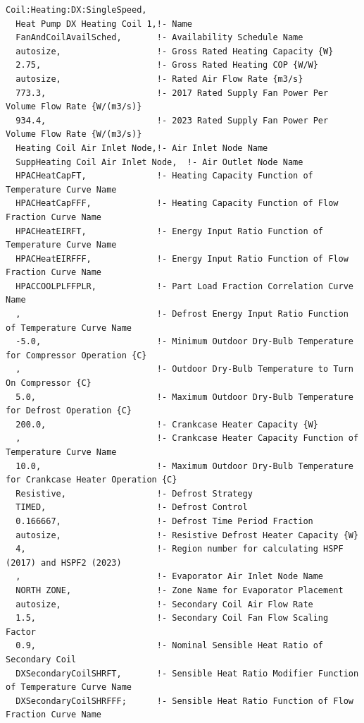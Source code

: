 \begin{lstlisting}
Coil:Heating:DX:SingleSpeed,
  Heat Pump DX Heating Coil 1,!- Name
  FanAndCoilAvailSched,       !- Availability Schedule Name
  autosize,                   !- Gross Rated Heating Capacity {W}
  2.75,                       !- Gross Rated Heating COP {W/W}
  autosize,                   !- Rated Air Flow Rate {m3/s}
  773.3,                      !- 2017 Rated Supply Fan Power Per Volume Flow Rate {W/(m3/s)}
  934.4,                      !- 2023 Rated Supply Fan Power Per Volume Flow Rate {W/(m3/s)}
  Heating Coil Air Inlet Node,!- Air Inlet Node Name
  SuppHeating Coil Air Inlet Node,  !- Air Outlet Node Name
  HPACHeatCapFT,              !- Heating Capacity Function of Temperature Curve Name
  HPACHeatCapFFF,             !- Heating Capacity Function of Flow Fraction Curve Name
  HPACHeatEIRFT,              !- Energy Input Ratio Function of Temperature Curve Name
  HPACHeatEIRFFF,             !- Energy Input Ratio Function of Flow Fraction Curve Name
  HPACCOOLPLFFPLR,            !- Part Load Fraction Correlation Curve Name
  ,                           !- Defrost Energy Input Ratio Function of Temperature Curve Name
  -5.0,                       !- Minimum Outdoor Dry-Bulb Temperature for Compressor Operation {C}
  ,                           !- Outdoor Dry-Bulb Temperature to Turn On Compressor {C}
  5.0,                        !- Maximum Outdoor Dry-Bulb Temperature for Defrost Operation {C}
  200.0,                      !- Crankcase Heater Capacity {W}
  ,                           !- Crankcase Heater Capacity Function of Temperature Curve Name
  10.0,                       !- Maximum Outdoor Dry-Bulb Temperature for Crankcase Heater Operation {C}
  Resistive,                  !- Defrost Strategy
  TIMED,                      !- Defrost Control
  0.166667,                   !- Defrost Time Period Fraction
  autosize,                   !- Resistive Defrost Heater Capacity {W}
  4,                          !- Region number for calculating HSPF (2017) and HSPF2 (2023)
  ,                           !- Evaporator Air Inlet Node Name
  NORTH ZONE,                 !- Zone Name for Evaporator Placement
  autosize,                   !- Secondary Coil Air Flow Rate
  1.5,                        !- Secondary Coil Fan Flow Scaling Factor
  0.9,                        !- Nominal Sensible Heat Ratio of Secondary Coil
  DXSecondaryCoilSHRFT,       !- Sensible Heat Ratio Modifier Function of Temperature Curve Name
  DXSecondaryCoilSHRFFF;      !- Sensible Heat Ratio Function of Flow Fraction Curve Name
\end{lstlisting}

